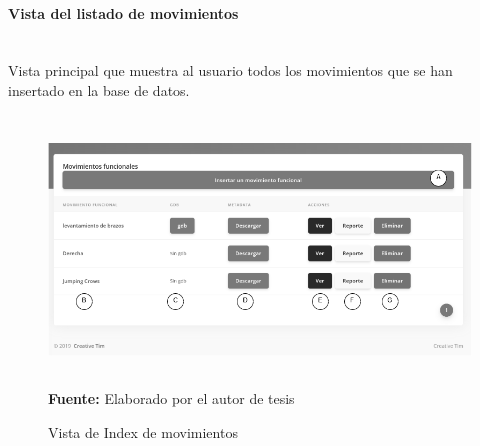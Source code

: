 \paragraph{Vista del listado de movimientos}\mbox{} \\ \label{ins:UI:web:index}
Vista principal que muestra al usuario todos los movimientos que se han insertado en la base de datos.
\begin{figure}[H]
	\caption{Vista de Index de movimientos}
	\label{fig:viewIndex}
	\centering
	\includegraphics[width=440px,height=270px]{graphics/web-index.PNG} \\
	\textbf{Fuente:} Elaborado por el autor de tesis
\end{figure}
